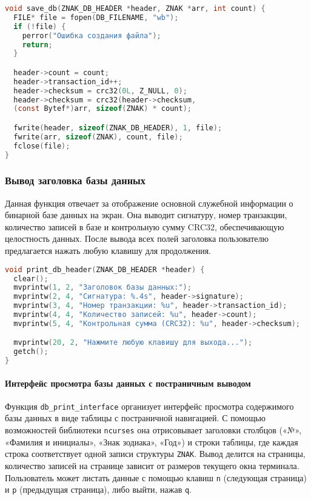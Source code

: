 \begin{lstlisting}[language=C, caption=Функция save\_db]
void save_db(ZNAK_DB_HEADER *header, ZNAK *arr, int count) {
  FILE* file = fopen(DB_FILENAME, "wb");
  if (!file) {
    perror("Ошибка создания файла");
    return;
  }

  header->count = count;
  header->transaction_id++;
  header->checksum = crc32(0L, Z_NULL, 0);
  header->checksum = crc32(header->checksum, 
  (const Bytef*)arr, sizeof(ZNAK) * count);

  fwrite(header, sizeof(ZNAK_DB_HEADER), 1, file);
  fwrite(arr, sizeof(ZNAK), count, file);
  fclose(file);
}
\end{lstlisting}

\subsubsection*{Вывод заголовка базы данных}
Данная функция отвечает за отображение основной служебной информации о бинарной базе данных на экран. Она выводит сигнатуру, номер транзакции, количество записей в базе и контрольную сумму CRC32, обеспечивающую целостность данных. После вывода всех полей заголовка пользователю предлагается нажать любую клавишу для продолжения.

\begin{lstlisting}[language=C, caption=Функция print\_db\_header]
void print_db_header(ZNAK_DB_HEADER *header) {
  clear();
  mvprintw(1, 2, "Заголовок базы данных:");
  mvprintw(2, 4, "Сигнатура: %.4s", header->signature);
  mvprintw(3, 4, "Номер транзакции: %u", header->transaction_id);
  mvprintw(4, 4, "Количество записей: %u", header->count);
  mvprintw(5, 4, "Контрольная сумма (CRC32): %u", header->checksum);

  mvprintw(20, 2, "Нажмите любую клавишу для выхода...");
  getch();
}
\end{lstlisting}

\paragraph*{Интерфейс просмотра базы данных с постраничным выводом}
Функция \texttt{db\_print\_interface} организует интерфейс просмотра содержимого базы данных в виде таблицы с постраничной навигацией. С помощью возможностей библиотеки \texttt{ncurses} она отрисовывает заголовки столбцов («№», «Фамилия и инициалы», «Знак зодиака», «Год») и строки таблицы, где каждая строка соответствует одной записи структуры \texttt{ZNAK}. Вывод делится на страницы, количество записей на странице зависит от размеров текущего окна терминала. Пользователь может листать данные с помощью клавиш \texttt{n} (следующая страница) и \texttt{p} (предыдущая страница), либо выйти, нажав \texttt{q}.

